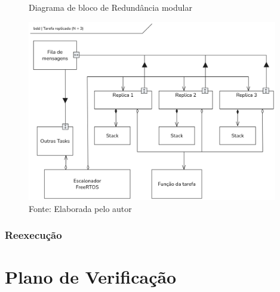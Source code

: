 \begin{figure}[H]
    \centering
    \caption{Diagrama de bloco de Redundância modular}
    \includegraphics[width=0.975\textwidth]{assets/tmr_bdd.png}
    \caption*{Fonte: Elaborada pelo autor}
    \label{fig:messageStruct}
\end{figure}

\subsubsection{Reexecução}


\section{Plano de Verificação}

